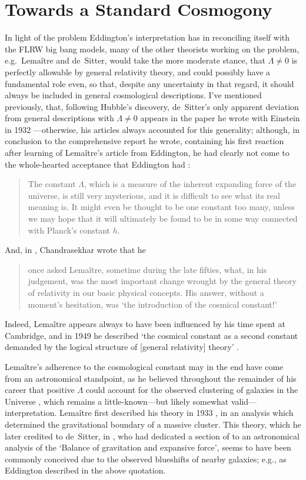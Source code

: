 \section{Towards a Standard Cosmogony\label{sec_TSC}}
In light of the problem Eddington's interpretation has in reconciling itself with the FLRW big bang models, many of the other theorists working on the problem, e.g.~Lema\^{i}tre and de~Sitter, would take the more moderate stance, that $\Lambda\neq0$ is perfectly allowable by general relativity theory, and could possibly have a fundamental role even, so that, despite any uncertainty in that regard, it should always be included in general cosmological descriptions. I've mentioned previously, that, following Hubble's discovery, de~Sitter's only apparent deviation from general descriptions with $\Lambda\neq0$ appears in the paper he wrote with Einstein in 1932 \cite{Einstein1932}---otherwise, his articles always accounted for this generality; although, in conclusion to the comprehensive report he wrote, containing his first reaction after learning of Lema\^{i}tre's article \cite{Lemaitre1927} from Eddington, he had clearly not come to the whole-hearted acceptance that Eddington had \cite{deSitter1930}:
\begin{quote}
The constant $\Lambda$, which is a measure of the inherent expanding force of the universe, is still very mysterious, and it is difficult to see what its real meaning is. It might even be thought to be one constant too many, unless we may hope that it will ultimately be found to be in some way connected with Planck's constant $h$.
\end{quote}
And, in \cite{Chandrasekhar1983}, Chandrasekhar wrote that he 
\begin{quote}
once asked Lema\^{i}tre, sometime during the late fifties, what, in his judgement, was the most important change wrought by the general theory of relativity in our basic physical concepts. His answer, without a moment's hesitation, was `the introduction of the cosmical constant!'
\end{quote}
Indeed, Lema\^{i}tre appears always to have been influenced by his time spent at Cambridge, and in 1949 he described `the cosmical constant as a second constant demanded by the logical structure of [general relativity] theory' \cite{Lemaitre1949}. 

Lema\^{i}tre's adherence to the cosmological constant may in the end have come from an astronomical standpoint, as he believed throughout the remainder of his career that positive $\Lambda$ could account for the observed clustering of galaxies in the Universe \cite{Lemaitre1933,Lemaitre1997,Lemaitre1934,Lemaitre1949,Lemaitre1952,Lemaitre1958}, which remains a little-known---but likely somewhat valid---interpretation. Lema\^{i}tre first described his theory in 1933 \cite{Lemaitre1933}, in an analysis which determined the gravitational boundary of a massive cluster. This theory, which he later credited to de~Sitter, in \cite{Lemaitre1949}, who had dedicated a section of \cite{deSitter1933a} to an astronomical analysis of the `Balance of gravitation and expansive force', seems to have been commonly conceived due to the observed blueshifts of nearby galaxies; e.g., as Eddington described in the above quotation. 

